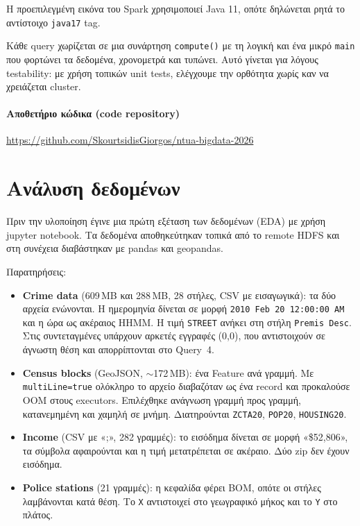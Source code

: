 \documentclass[11pt]{article}
\newcommand{\code}[1]{\texttt{\small #1}}
\newcommand{\en}[1]{\textenglish{#1}}
\begin{document}
Η προεπιλεγμένη εικόνα του \en{Spark} χρησιμοποιεί \en{Java} 11, οπότε δηλώνεται
ρητά το αντίστοιχο \code{java17} tag.

Κάθε \en{query} χωρίζεται σε μια συνάρτηση
\code{compute()} με τη λογική και ένα μικρό \code{main} που φορτώνει τα δεδομένα,
χρονομετρά και τυπώνει. Αυτό γίνεται για λόγους testability: με χρήση τοπικών \en{unit tests},
ελέγχουμε την ορθότητα χωρίς καν να χρειάζεται cluster.

\paragraph{Αποθετήριο κώδικα (code repository)} \url{https://github.com/SkourtsidisGiorgos/ntua-bigdata-2026}

\section{Aνάλυση δεδομένων}

Πριν την υλοποίηση έγινε μια πρώτη εξέταση των δεδομένων (EDA) με χρήση \en{jupyter notebook}.
Τα δεδομένα αποθηκεύτηκαν τοπικά από το \en{remote HDFS} και στη συνέχεια διαβάστηκαν με \en{pandas} και \en{geopandas}.

Παρατηρήσεις:

\begin{itemize}
\item \textbf{\en{Crime data}} (609\,MB και 288\,MB, 28 στήλες, \en{CSV} με
εισαγωγικά): τα δύο αρχεία ενώνονται. Η ημερομηνία δίνεται σε μορφή
\code{2010 Feb 20 12:00:00 AM} και η ώρα ως ακέραιος \en{HHMM}. Η τιμή \code{STREET}
ανήκει στη στήλη \code{Premis Desc}. Στις συντεταγμένες υπάρχουν αρκετές εγγραφές
(0,0), που αντιστοιχούν σε άγνωστη θέση και απορρίπτονται στο \en{Query}~4.
\item \textbf{\en{Census blocks}} (\en{GeoJSON}, $\sim$172\,MB): ένα \en{Feature}
ανά γραμμή. Με \code{multiLine=true} ολόκληρο το αρχείο διαβαζόταν ως ένα
\en{record} και προκαλούσε \en{OOM} στους \en{executors}. Επιλέχθηκε ανάγνωση
γραμμή προς γραμμή, κατανεμημένη και χαμηλή σε μνήμη. Διατηρούνται \code{ZCTA20},
\code{POP20}, \code{HOUSING20}.
\item \textbf{\en{Income}} (\en{CSV} με «;», 282 γραμμές): το εισόδημα δίνεται σε
μορφή «\$52,806», τα σύμβολα αφαιρούνται και η τιμή μετατρέπεται σε ακέραιο. Δύο
\en{zip} δεν έχουν εισόδημα.
\item \textbf{\en{Police stations}} (21 γραμμές): η κεφαλίδα φέρει \en{BOM}, οπότε
οι στήλες λαμβάνονται κατά θέση. Το \code{X} αντιστοιχεί στο γεωγραφικό μήκος και
το \code{Y} στο πλάτος.
\end{itemize}
\end{document}
